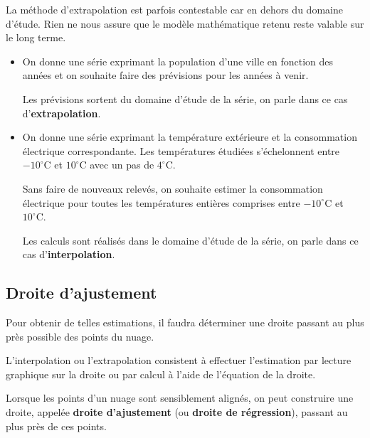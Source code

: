 \begin{rem}
	La méthode d'extrapolation est parfois contestable car en dehors du domaine d'étude. Rien ne nous assure que le modèle mathématique retenu reste valable sur le long terme.
\end{rem}

\begin{ex}
	\nline
	\begin{itemize}
		\item On donne une série exprimant la population d'une ville en fonction des années et on souhaite faire des prévisions pour les années à venir.

		      Les prévisions sortent du domaine d'étude de la série, on parle dans ce cas d'\textbf{extrapolation}.

		\item On donne une série exprimant la température extérieure et la consommation électrique correspondante. Les températures étudiées s'échelonnent entre $-10^{\circ}\text{C}$ et $10^{\circ}\text{C}$ avec un pas de $4^{\circ}\text{C}$.

		      Sans faire de nouveaux relevés, on souhaite estimer la consommation électrique pour toutes les températures entières comprises entre $-10^{\circ}\text{C}$ et $10^{\circ}\text{C}$.

		      Les calculs sont réalisés dans le domaine d'étude de la série, on parle dans ce cas d'\textbf{interpolation}.
	\end{itemize}
\end{ex}

\subsection{Droite d'ajustement}

Pour obtenir de telles estimations, il faudra déterminer une droite passant \og au plus près possible \fg{} des points du nuage.

L'interpolation ou l'extrapolation consistent à effectuer l'estimation par lecture graphique sur la droite ou par calcul à l'aide de l'équation de la droite.

\begin{defin}
	Lorsque les points d'un nuage sont sensiblement alignés, on peut construire une droite, appelée \textbf{droite d'ajustement} (ou \textbf{droite de régression}), passant \og au plus près \fg{} de ces points.
\end{defin}

